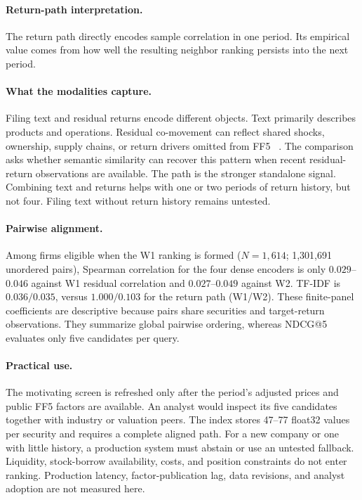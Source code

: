 \documentclass[sigconf,anonymous]{acmart}
\begin{document}
\paragraph{Return-path interpretation.}
The return path directly encodes sample correlation in one period.  Its
empirical value comes from how well the resulting neighbor ranking persists
into the next period.

\paragraph{What the modalities capture.}
Filing text and residual returns encode different objects.  Text primarily
describes products and operations.  Residual co-movement can reflect shared
shocks, ownership, supply chains, or return drivers omitted from FF5
~\citep{barberis2005comovement,cohen2008economic,anton2014connected}.
The comparison asks whether semantic similarity can recover this pattern when
recent residual-return observations are available.  The path is the stronger
standalone signal.  Combining text and returns helps with one or two periods of
return history, but not four.  Filing text without return history remains
untested.

\paragraph{Pairwise alignment.}
Among firms eligible when the W1 ranking is formed ($N=1{,}614$; 1{,}301{,}691
unordered pairs), Spearman correlation for the four dense encoders is only
$0.029$--$0.046$ against W1 residual correlation and $0.027$--$0.049$ against
W2.  TF-IDF is $0.036/0.035$, versus $1.000/0.103$ for the return path
(W1/W2).  These finite-panel coefficients are descriptive because pairs share
securities and target-return observations.  They summarize global pairwise
ordering, whereas NDCG@5 evaluates only five candidates per query.

\paragraph{Practical use.}
The motivating screen is refreshed only after the period's adjusted prices and
public FF5 factors are available.  An analyst would inspect its five candidates
together with industry or valuation peers.  The index stores 47--77 float32
values per security and requires a complete aligned path.  For a new company or
one with little history, a production system must abstain or use an
untested fallback.  Liquidity, stock-borrow availability, costs, and position
constraints do not enter ranking.  Production latency, factor-publication lag,
data revisions, and analyst adoption are not measured here.
\end{document}

